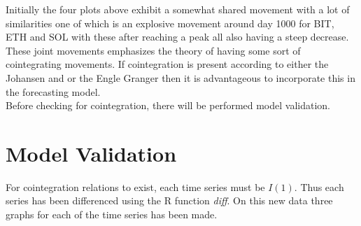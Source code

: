 Initially the four plots above exhibit a somewhat shared movement with a lot of similarities one of which is an explosive movement around day 1000 for BIT, ETH and SOL with these after reaching a peak all also having a steep decrease. These joint movements emphasizes the theory of having some sort of cointegrating movements. If cointegration is present according to either the Johansen and or the Engle Granger then it is advantageous to incorporate this in the forecasting model.\\
Before checking for cointegration, there will be performed model validation.


\section{Model Validation}
For cointegration relations to exist, each time series must be $I(1)$. Thus each series has been differenced using the R function \textit{diff}. On this new data three graphs for each of the time series has been made. 
